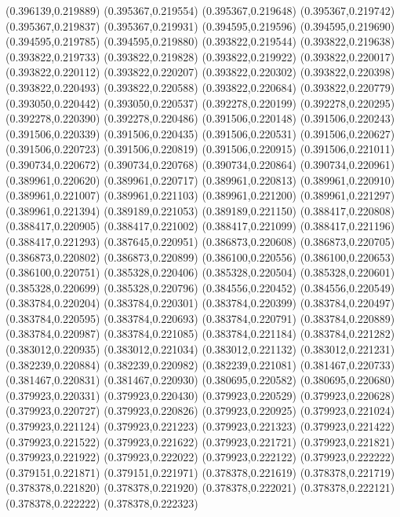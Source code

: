 (0.396139,0.219889)
(0.395367,0.219554)
(0.395367,0.219648)
(0.395367,0.219742)
(0.395367,0.219837)
(0.395367,0.219931)
(0.394595,0.219596)
(0.394595,0.219690)
(0.394595,0.219785)
(0.394595,0.219880)
(0.393822,0.219544)
(0.393822,0.219638)
(0.393822,0.219733)
(0.393822,0.219828)
(0.393822,0.219922)
(0.393822,0.220017)
(0.393822,0.220112)
(0.393822,0.220207)
(0.393822,0.220302)
(0.393822,0.220398)
(0.393822,0.220493)
(0.393822,0.220588)
(0.393822,0.220684)
(0.393822,0.220779)
(0.393050,0.220442)
(0.393050,0.220537)
(0.392278,0.220199)
(0.392278,0.220295)
(0.392278,0.220390)
(0.392278,0.220486)
(0.391506,0.220148)
(0.391506,0.220243)
(0.391506,0.220339)
(0.391506,0.220435)
(0.391506,0.220531)
(0.391506,0.220627)
(0.391506,0.220723)
(0.391506,0.220819)
(0.391506,0.220915)
(0.391506,0.221011)
(0.390734,0.220672)
(0.390734,0.220768)
(0.390734,0.220864)
(0.390734,0.220961)
(0.389961,0.220620)
(0.389961,0.220717)
(0.389961,0.220813)
(0.389961,0.220910)
(0.389961,0.221007)
(0.389961,0.221103)
(0.389961,0.221200)
(0.389961,0.221297)
(0.389961,0.221394)
(0.389189,0.221053)
(0.389189,0.221150)
(0.388417,0.220808)
(0.388417,0.220905)
(0.388417,0.221002)
(0.388417,0.221099)
(0.388417,0.221196)
(0.388417,0.221293)
(0.387645,0.220951)
(0.386873,0.220608)
(0.386873,0.220705)
(0.386873,0.220802)
(0.386873,0.220899)
(0.386100,0.220556)
(0.386100,0.220653)
(0.386100,0.220751)
(0.385328,0.220406)
(0.385328,0.220504)
(0.385328,0.220601)
(0.385328,0.220699)
(0.385328,0.220796)
(0.384556,0.220452)
(0.384556,0.220549)
(0.383784,0.220204)
(0.383784,0.220301)
(0.383784,0.220399)
(0.383784,0.220497)
(0.383784,0.220595)
(0.383784,0.220693)
(0.383784,0.220791)
(0.383784,0.220889)
(0.383784,0.220987)
(0.383784,0.221085)
(0.383784,0.221184)
(0.383784,0.221282)
(0.383012,0.220935)
(0.383012,0.221034)
(0.383012,0.221132)
(0.383012,0.221231)
(0.382239,0.220884)
(0.382239,0.220982)
(0.382239,0.221081)
(0.381467,0.220733)
(0.381467,0.220831)
(0.381467,0.220930)
(0.380695,0.220582)
(0.380695,0.220680)
(0.379923,0.220331)
(0.379923,0.220430)
(0.379923,0.220529)
(0.379923,0.220628)
(0.379923,0.220727)
(0.379923,0.220826)
(0.379923,0.220925)
(0.379923,0.221024)
(0.379923,0.221124)
(0.379923,0.221223)
(0.379923,0.221323)
(0.379923,0.221422)
(0.379923,0.221522)
(0.379923,0.221622)
(0.379923,0.221721)
(0.379923,0.221821)
(0.379923,0.221922)
(0.379923,0.222022)
(0.379923,0.222122)
(0.379923,0.222222)
(0.379151,0.221871)
(0.379151,0.221971)
(0.378378,0.221619)
(0.378378,0.221719)
(0.378378,0.221820)
(0.378378,0.221920)
(0.378378,0.222021)
(0.378378,0.222121)
(0.378378,0.222222)
(0.378378,0.222323)
